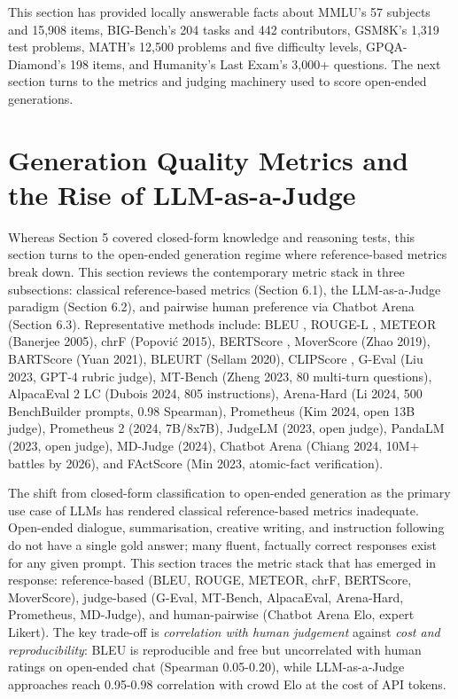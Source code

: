 \documentclass{article}
\begin{document}
This section has provided locally answerable facts about MMLU's 57 subjects and 15,908 items, BIG-Bench's 204 tasks and 442 contributors, GSM8K's 1,319 test problems, MATH's 12,500 problems and five difficulty levels, GPQA-Diamond's 198 items, and Humanity's Last Exam's 3,000+ questions. The next section turns to the metrics and judging machinery used to score open-ended generations.

\section{Generation Quality Metrics and the Rise of LLM-as-a-Judge}\label{generation-quality-metrics-and-the-rise-of-llm-as-a-judge}

Whereas Section 5 covered closed-form knowledge and reasoning tests, this section turns to the open-ended generation regime where reference-based metrics break down. This section reviews the contemporary metric stack in three subsections: classical reference-based metrics (Section 6.1), the LLM-as-a-Judge paradigm (Section 6.2), and pairwise human preference via Chatbot Arena (Section 6.3). Representative methods include: BLEU \citep{papineni2002bleuamethodforauto}, ROUGE-L \citep{lin2004rougeapackageforau}, METEOR (Banerjee 2005), chrF (Popović 2015), BERTScore \citep{zhang2020bertscoreevaluatin}, MoverScore (Zhao 2019), BARTScore (Yuan 2021), BLEURT (Sellam 2020), CLIPScore \citep{hessel20212021}, G-Eval (Liu 2023, GPT-4 rubric judge), MT-Bench (Zheng 2023, 80 multi-turn questions), AlpacaEval 2 LC (Dubois 2024, 805 instructions), Arena-Hard (Li 2024, 500 BenchBuilder prompts, 0.98 Spearman), Prometheus (Kim 2024, open 13B judge), Prometheus 2 (2024, 7B/8x7B), JudgeLM (2023, open judge), PandaLM (2023, open judge), MD-Judge (2024), Chatbot Arena (Chiang 2024, 10M+ battles by 2026), and FActScore (Min 2023, atomic-fact verification).

The shift from closed-form classification to open-ended generation as the primary use case of LLMs has rendered classical reference-based metrics inadequate. Open-ended dialogue, summarisation, creative writing, and instruction following do not have a single gold answer; many fluent, factually correct responses exist for any given prompt. This section traces the metric stack that has emerged in response: reference-based (BLEU, ROUGE, METEOR, chrF, BERTScore, MoverScore), judge-based (G-Eval, MT-Bench, AlpacaEval, Arena-Hard, Prometheus, MD-Judge), and human-pairwise (Chatbot Arena Elo, expert Likert). The key trade-off is \emph{correlation with human judgement} against \emph{cost and reproducibility}: BLEU is reproducible and free but uncorrelated with human ratings on open-ended chat (Spearman 0.05-0.20), while LLM-as-a-Judge approaches reach 0.95-0.98 correlation with crowd Elo at the cost of API tokens.
\end{document}
